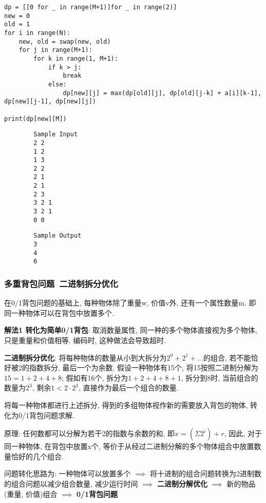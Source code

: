 \documentclass[../main]{subfiles}
\begin{document}
\begin{sloppy}
\begin{lstlisting}[style = Python]
dp = [[0 for _ in range(M+1)]for _ in range(2)]
new = 0
old = 1
for i in range(N):
    new, old = swap(new, old)
    for j in range(M+1):
        for k in range(1, M+1):
            if k > j:
                break
            else:
                dp[new][j] = max(dp[old][j], dp[old][j-k] + a[i][k-1], dp[new][j-1], dp[new][j])

print(dp[new][M])
\end{lstlisting}

\begin{center}
\begin{minipage}[t]{0.48\textwidth}
    \begin{verbatim}
        Sample Input
        2 2
        1 2
        1 3
        2 2
        2 1
        2 1
        2 3
        3 2 1
        3 2 1
        0 0
    \end{verbatim}
\end{minipage}
\begin{minipage}[t]{0.48\textwidth}
    \begin{verbatim}       
        Sample Output
        3
        4
        6
    \end{verbatim}
\end{minipage}
\end{center}

\newpage
\subsubsection{多重背包问题\ 二进制拆分优化}

在0/1背包问题的基础上, 每种物体除了重量w, 价值v外, 还有一个属性数量m. 即同一种物体可以在背包中放置多个.

\textbf{解法1 转化为简单0/1背包}: 取消数量属性, 同一种的多个物体直接视为多个物体, 只是重量和价值相等. 编码时, 这种做法会导致超时.

\textbf{二进制拆分优化}: 将每种物体的数量从小到大拆分为$2^0+2^1+...$的组合, 若不能恰好被2的指数拆分, 最后一个为余数. 假设一种物体有15个, 将15按照二进制分解为$15=1+2+4+8$; 假如有16个, 拆分为$1+2+4+8+1$, 拆分到8时, 当前组合的数量为$2^3$, 剩余$1<2 \cdot 2^3$, 直接作为最后一个组合的数量.

将每一种物体都进行上述拆分, 得到的多组物体视作新的需要放入背包的物体, 转化为0/1背包问题求解.

原理: 任何数都可以分解为若干2的指数与余数的和, 即$x = (\Sigma{2^i}) + r$, 因此, 对于同一种物体, 在背包中放置x个, 等价于从经过二进制分解的多个物体组合中放置数量恰好的几个组合. 

问题转化思路为: 一种物体可以放置多个 $\implies$ 将十进制的组合问题转换为2进制数的组合问题以减少组合数量, 减少运行时间 $\implies$ \textbf{二进制分解优化} $\implies$ 新的物品(重量, 价值)组合 $\implies$ \textbf{0/1背包问题}


\end{sloppy}
\end{document}
